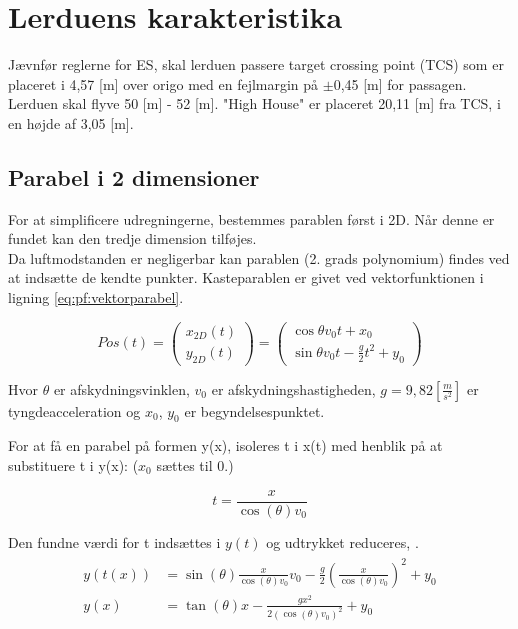 \section{Lerduens karakteristika}
\label{sec:udregning_af_parabel}

Jævnfør reglerne for ES, skal lerduen passere target crossing point (TCS) som er 
placeret i 4,57 [m] over origo med en fejlmargin på \(\pm\)0,45 [m] for passagen. 
Lerduen skal flyve 50 [m] - 52 [m]. "High House" er placeret 20,11 [m] fra TCS, i en 
højde af 3,05 [m]. 

\subsection{Parabel i 2 dimensioner}
For at simplificere udregningerne, bestemmes parablen først i 2D. Når denne er fundet kan den tredje dimension tilføjes.\\

Da luftmodstanden er negligerbar kan parablen (2. grads polynomium) findes ved at indsætte de kendte punkter. Kasteparablen er givet ved vektorfunktionen i ligning \ref{eq:pf:vektorparabel}.

\begin{equation}
	Pos(t) = \left( \begin{array}{c}
	x_{2D}(t) \\
	y_{2D}(t)
	\end{array}
	\right)
	= \left( \begin{array}{c}
	\cos \theta v_0 t + x_0 \\
	\sin \theta v_0 t - \frac{g}{2} t^2 + y_0
	\end{array}
	\right)
\label{eq:pf:vektorparabel}
\end{equation}

Hvor \(\theta\) er afskydningsvinklen, \(v_0\) er afskydningshastigheden, \(g=9,82 \left[ \frac { m }{ { s }^{ 2 } } \right] \) er tyngdeacceleration og \(x_0\), \(y_0\) er begyndelsespunktet. 

For at få en parabel på formen y(x), isoleres t i x(t) med henblik på at substituere t i y(x): (\(x_0\) sættes til 0.)

\begin{equation}
t = \frac{x}{\cos \left( \theta \right) v_0}
\label{eq:pf:x(t)}
\end{equation}

Den fundne værdi for t indsættes i \(y(t)\) og udtrykket reduceres, \citep[Side. 67]{fund_of_physics}.
\begin{align}
\begin{split}
y(t(x)) &= \sin \left( \theta \right) \frac{x}{\cos \left( \theta \right) v_0} v_0 - \frac{g}{2} \left(\frac{x}{\cos \left( \theta \right) v_0}\right)^2 + y_0 \\
y(x) &= \tan \left( \theta \right) x - \frac{gx^2}{2(\cos \left( \theta \right) v_0)^2} + y_0
\label{eq:pf:y(x(t))}
\end{split}
\end{align}

